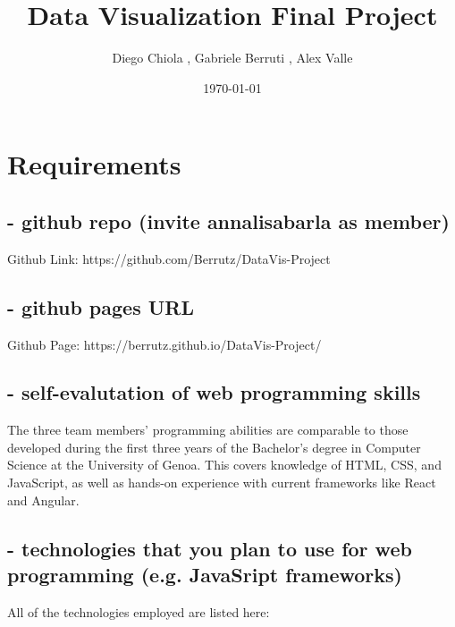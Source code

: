 \documentclass{article}
\title{Data Visualization Final Project}
\author{Diego Chiola , Gabriele Berruti , Alex Valle}
\date{\today}                %
\begin{document}
\maketitle                   %

\section{Requirements}

\subsection{- github repo (invite annalisabarla as member)}
Github Link: https://github.com/Berrutz/DataVis-Project

\subsection{- github pages URL}
Github Page: https://berrutz.github.io/DataVis-Project/

\subsection{- self-evalutation of web programming skills}
The three team members' programming abilities are comparable to those developed during the first three years of the Bachelor's degree in 
Computer Science at the University of Genoa.
This covers knowledge of HTML, CSS, and JavaScript, as well as hands-on experience with current frameworks like React and Angular.

\subsection{- technologies that you plan to use for web programming (e.g. JavaSript frameworks)}
All of the technologies employed are listed here:
\end{document}
